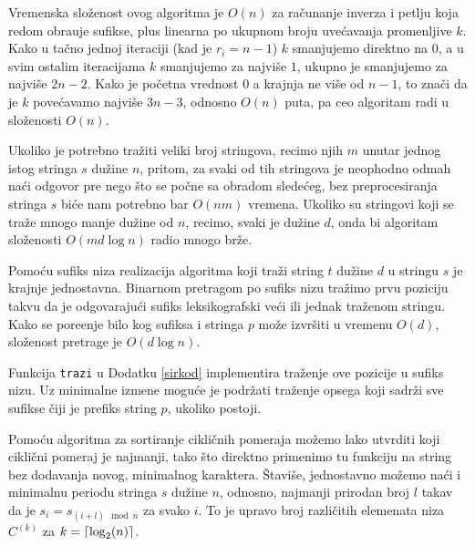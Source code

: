 Vremenska slo\v zenost ovog algoritma je $O(n)$ za ra\v cunanje inverza i petlju koja redom obra\dj uje sufikse, plus linearna po ukupnom broju uve\' cavanja promenljive $k$. Kako u ta\v cno jednoj iteraciji (kad je $r_i = n-1$) $k$ smanjujemo direktno na $0$, a u svim ostalim iteracijama $k$ smanjujemo za najvi\v se $1$, ukupno je smanjujemo za najvi\v se $2n-2$. Kako je po\v cetna vrednost $0$ a krajnja ne vi\v se od $n-1$, to zna\v ci da je $k$ pove\' cavamo najvi\v se $3n-3$, odnosno $O(n)$ puta, pa ceo algoritam radi u slo\v zenosti $O(n)$.



Ukoliko je potrebno tra\v ziti veliki broj stringova, recimo njih $m$ unutar jednog istog stringa $s$ du\v zine $n$, pritom, za svaki od tih stringova je neophodno odmah na\' ci odgovor pre nego \v sto se po\v cne sa obradom slede\' ceg, bez preprocesiranja stringa $s$ bi\' ce nam potrebno bar $O(nm)$ vremena. Ukoliko su stringovi koji se tra\v ze mnogo manje du\v zine od $n$, recimo, svaki je du\v zine $d$, onda bi algoritam slo\v zenosti $O(md\log n)$ radio mnogo br\v ze.

Pomo\' cu sufiks niza realizacija algoritma koji tra\v zi string $t$ du\v zine $d$ u stringu $s$ je krajnje jednostavna. Binarnom pretragom po sufiks nizu tra\v zimo prvu poziciju takvu da je odgovaraju\' ci sufiks leksikografski ve\' ci ili jednak tra\v zenom stringu. Kako se pore\dj enje bilo kog sufiksa i stringa $p$ mo\v ze izvr\v siti u vremenu $O(d)$, slo\v zenost pretrage je $O(d \log n)$.

Funkcija \texttt{trazi} u Dodatku \ref{sirkod} implementira tra\v zenje ove pozicije u sufiks nizu. Uz minimalne izmene mogu\' ce je podr\v zati tra\v zenje opsega koji sadr\v zi sve sufikse \v ciji je prefiks string $p$, ukoliko postoji.


Pomo\' cu algoritma za sortiranje cikli\v cnih pomeraja mo\v zemo lako utvrditi koji cikli\v cni pomeraj je najmanji, tako \v sto direktno primenimo tu funkciju na string bez dodavanja novog, minimalnog karaktera. \v Stavi\v se, jednostavno mo\v zemo na\' ci i minimalnu periodu stringa $s$ du\v zine $n$, odnosno, najmanji prirodan broj $l$ takav da je $s_i = s_{(i+l) \mod n}$ za svako $i$. To je upravo broj razli\v citih elemenata niza $C^{(k)}$ za $k = \left \lceil \log_2(n) \right \rceil$.

